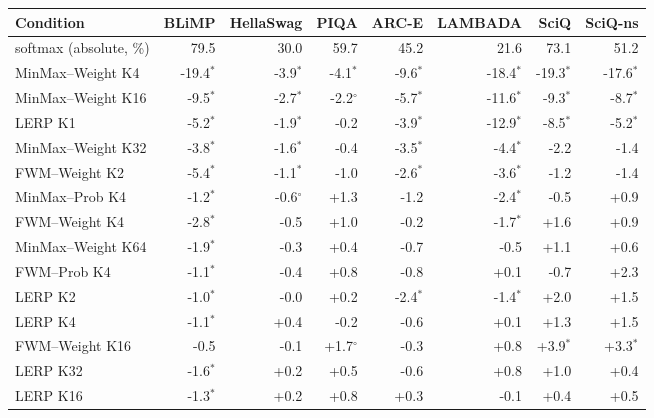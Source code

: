 \begin{tabular}{lrrrrrrr}
\toprule
Condition & BLiMP & HellaSwag & PIQA & ARC-E & LAMBADA & SciQ & SciQ-ns \\
\midrule
softmax (absolute, \%) & 79.5 & 30.0 & 59.7 & 45.2 & 21.6 & 73.1 & 51.2 \\ \midrule
MinMax--Weight K4 & -19.4$^{*}$ & -3.9$^{*}$ & -4.1$^{*}$ & -9.6$^{*}$ & -18.4$^{*}$ & -19.3$^{*}$ & -17.6$^{*}$ \\
MinMax--Weight K16 & -9.5$^{*}$ & -2.7$^{*}$ & -2.2$^{\circ}$ & -5.7$^{*}$ & -11.6$^{*}$ & -9.3$^{*}$ & -8.7$^{*}$ \\
LERP K1 & -5.2$^{*}$ & -1.9$^{*}$ & -0.2 & -3.9$^{*}$ & -12.9$^{*}$ & -8.5$^{*}$ & -5.2$^{*}$ \\
MinMax--Weight K32 & -3.8$^{*}$ & -1.6$^{*}$ & -0.4 & -3.5$^{*}$ & -4.4$^{*}$ & -2.2 & -1.4 \\
FWM--Weight K2 & -5.4$^{*}$ & -1.1$^{*}$ & -1.0 & -2.6$^{*}$ & -3.6$^{*}$ & -1.2 & -1.4 \\ \midrule
MinMax--Prob K4 & -1.2$^{*}$ & -0.6$^{\circ}$ & +1.3 & -1.2 & -2.4$^{*}$ & -0.5 & +0.9 \\
FWM--Weight K4 & -2.8$^{*}$ & -0.5 & +1.0 & -0.2 & -1.7$^{*}$ & +1.6 & +0.9 \\
MinMax--Weight K64 & -1.9$^{*}$ & -0.3 & +0.4 & -0.7 & -0.5 & +1.1 & +0.6 \\
FWM--Prob K4 & -1.1$^{*}$ & -0.4 & +0.8 & -0.8 & +0.1 & -0.7 & +2.3 \\ \midrule
LERP K2 & -1.0$^{*}$ & -0.0 & +0.2 & -2.4$^{*}$ & -1.4$^{*}$ & +2.0 & +1.5 \\
LERP K4 & -1.1$^{*}$ & +0.4 & -0.2 & -0.6 & +0.1 & +1.3 & +1.5 \\
FWM--Weight K16 & -0.5 & -0.1 & +1.7$^{\circ}$ & -0.3 & +0.8 & +3.9$^{*}$ & +3.3$^{*}$ \\
LERP K32 & -1.6$^{*}$ & +0.2 & +0.5 & -0.6 & +0.8 & +1.0 & +0.4 \\
LERP K16 & -1.3$^{*}$ & +0.2 & +0.8 & +0.3 & -0.1 & +0.4 & +0.5 \\
\bottomrule
\end{tabular}
